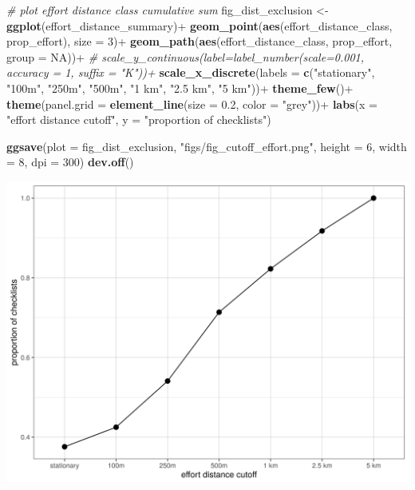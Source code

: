\documentclass[]{article}
\newenvironment{Shaded}{}{}
\newcommand{\CommentTok}[1]{\textcolor[rgb]{0.38,0.63,0.69}{\textit{#1}}}
\newcommand{\DataTypeTok}[1]{\textcolor[rgb]{0.56,0.13,0.00}{#1}}
\newcommand{\DecValTok}[1]{\textcolor[rgb]{0.25,0.63,0.44}{#1}}
\newcommand{\FloatTok}[1]{\textcolor[rgb]{0.25,0.63,0.44}{#1}}
\newcommand{\KeywordTok}[1]{\textcolor[rgb]{0.00,0.44,0.13}{\textbf{#1}}}
\newcommand{\NormalTok}[1]{#1}
\newcommand{\OperatorTok}[1]{\textcolor[rgb]{0.40,0.40,0.40}{#1}}
\newcommand{\OtherTok}[1]{\textcolor[rgb]{0.00,0.44,0.13}{#1}}
\newcommand{\StringTok}[1]{\textcolor[rgb]{0.25,0.44,0.63}{#1}}
\begin{document}
\begin{Shaded}
\begin{Highlighting}[]
\CommentTok{# plot effort distance class cumulative sum}
\NormalTok{fig_dist_exclusion <-}\StringTok{ }\KeywordTok{ggplot}\NormalTok{(effort_distance_summary)}\OperatorTok{+}
\StringTok{  }\KeywordTok{geom_point}\NormalTok{(}\KeywordTok{aes}\NormalTok{(effort_distance_class, prop_effort), }\DataTypeTok{size =} \DecValTok{3}\NormalTok{)}\OperatorTok{+}
\StringTok{  }\KeywordTok{geom_path}\NormalTok{(}\KeywordTok{aes}\NormalTok{(effort_distance_class, prop_effort, }\DataTypeTok{group =} \OtherTok{NA}\NormalTok{))}\OperatorTok{+}
\StringTok{  }\CommentTok{# scale_y_continuous(label=label_number(scale=0.001, accuracy = 1, suffix = "K"))+}
\StringTok{  }\KeywordTok{scale_x_discrete}\NormalTok{(}\DataTypeTok{labels =} \KeywordTok{c}\NormalTok{(}\StringTok{"stationary"}\NormalTok{, }\StringTok{"100m"}\NormalTok{, }\StringTok{"250m"}\NormalTok{, }\StringTok{"500m"}\NormalTok{, }\StringTok{"1 km"}\NormalTok{, }\StringTok{"2.5 km"}\NormalTok{, }\StringTok{"5 km"}\NormalTok{))}\OperatorTok{+}
\StringTok{  }\KeywordTok{theme_few}\NormalTok{()}\OperatorTok{+}
\StringTok{  }\KeywordTok{theme}\NormalTok{(}\DataTypeTok{panel.grid =} \KeywordTok{element_line}\NormalTok{(}\DataTypeTok{size =} \FloatTok{0.2}\NormalTok{, }\DataTypeTok{color =} \StringTok{"grey"}\NormalTok{))}\OperatorTok{+}
\StringTok{  }\KeywordTok{labs}\NormalTok{(}\DataTypeTok{x =} \StringTok{"effort distance cutoff"}\NormalTok{, }\DataTypeTok{y =} \StringTok{"proportion of checklists"}\NormalTok{)}

\KeywordTok{ggsave}\NormalTok{(}\DataTypeTok{plot =}\NormalTok{ fig_dist_exclusion, }\StringTok{"figs/fig_cutoff_effort.png"}\NormalTok{, }\DataTypeTok{height =} \DecValTok{6}\NormalTok{, }\DataTypeTok{width =} \DecValTok{8}\NormalTok{, }\DataTypeTok{dpi =} \DecValTok{300}\NormalTok{)}
\KeywordTok{dev.off}\NormalTok{()}
\end{Highlighting}
\end{Shaded}

\includegraphics{figs/fig_cutoff_effort.png}
\end{document}
